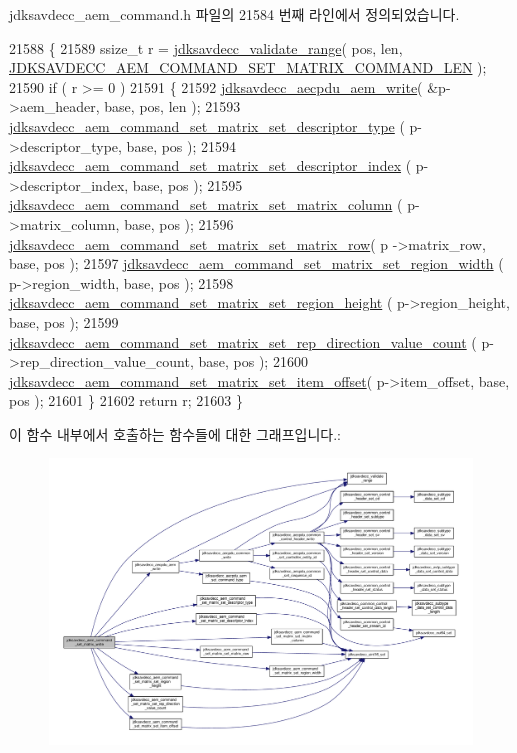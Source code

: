 jdksavdecc\+\_\+aem\+\_\+command.\+h 파일의 21584 번째 라인에서 정의되었습니다.


\begin{DoxyCode}
21588 \{
21589     ssize\_t r = \hyperlink{group__util_ga9c02bdfe76c69163647c3196db7a73a1}{jdksavdecc\_validate\_range}( pos, len, 
      \hyperlink{group__command__set__matrix_ga5ad958d8f2ee7694dbb39755b4df28c8}{JDKSAVDECC\_AEM\_COMMAND\_SET\_MATRIX\_COMMAND\_LEN} );
21590     \textcolor{keywordflow}{if} ( r >= 0 )
21591     \{
21592         \hyperlink{group__aecpdu__aem_gad658e55771cce77cecf7aae91e1dcbc5}{jdksavdecc\_aecpdu\_aem\_write}( &p->aem\_header, base, pos, len );
21593         \hyperlink{group__command__set__matrix_gad41fa222412ebec9411b38e8c60fede5}{jdksavdecc\_aem\_command\_set\_matrix\_set\_descriptor\_type}
      ( p->descriptor\_type, base, pos );
21594         \hyperlink{group__command__set__matrix_ga3f538e61ffb5f8f6e95fa8d8836ac90b}{jdksavdecc\_aem\_command\_set\_matrix\_set\_descriptor\_index}
      ( p->descriptor\_index, base, pos );
21595         \hyperlink{group__command__set__matrix_gac30847873ca76d4467e468e3afb6c7ab}{jdksavdecc\_aem\_command\_set\_matrix\_set\_matrix\_column}
      ( p->matrix\_column, base, pos );
21596         \hyperlink{group__command__set__matrix_gad36a5fd11832d3526dd64e171eb629db}{jdksavdecc\_aem\_command\_set\_matrix\_set\_matrix\_row}( p
      ->matrix\_row, base, pos );
21597         \hyperlink{group__command__set__matrix_ga8d5c5405af6b74c13aa4260ef81a0e50}{jdksavdecc\_aem\_command\_set\_matrix\_set\_region\_width}
      ( p->region\_width, base, pos );
21598         \hyperlink{group__command__set__matrix_gaee0bb039ff3476a18a7825de351edff1}{jdksavdecc\_aem\_command\_set\_matrix\_set\_region\_height}
      ( p->region\_height, base, pos );
21599         \hyperlink{group__command__set__matrix_ga4124ae7b0d8518fb92dd5f8643e2ce7d}{jdksavdecc\_aem\_command\_set\_matrix\_set\_rep\_direction\_value\_count}
      ( p->rep\_direction\_value\_count, base, pos );
21600         \hyperlink{group__command__set__matrix_ga8022b799a7b6fb35924a778f95166582}{jdksavdecc\_aem\_command\_set\_matrix\_set\_item\_offset}(
       p->item\_offset, base, pos );
21601     \}
21602     \textcolor{keywordflow}{return} r;
21603 \}
\end{DoxyCode}


이 함수 내부에서 호출하는 함수들에 대한 그래프입니다.\+:
\nopagebreak
\begin{figure}[H]
\begin{center}
\leavevmode
\includegraphics[width=350pt]{group__command__set__matrix_gab9728a1288d8e2a0c297ca9b43624ca8_cgraph}
\end{center}
\end{figure}


